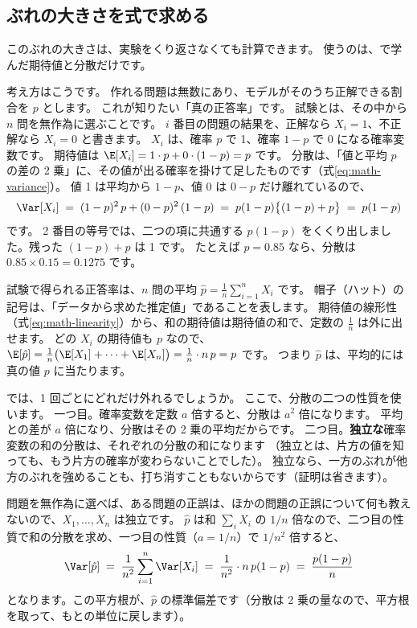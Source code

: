 \subsection*{ぶれの大きさを式で求める}

このぶれの大きさは、実験をくり返さなくても計算できます。
使うのは、で学んだ期待値と分散だけです。

考え方はこうです。
作れる問題は無数にあり、モデルがそのうち正解できる割合を $p$ とします。
これが知りたい「真の正答率」です。
試験とは、その中から $n$ 問を無作為に選ぶことです。
$i$ 番目の問題の結果を、正解なら $X_i=1$、不正解なら $X_i=0$ と書きます。
$X_i$ は、確率 $p$ で 1、確率 $1-p$ で 0 になる確率変数です。
期待値は $\E[X_i]=1\cdot p+0\cdot(1-p)=p$ です。
分散は、「値と平均 $p$ の差の 2 乗」に、その値が出る確率を掛けて足したものです（式\eqref{eq:math-variance}）。
値 1 は平均から $1-p$、値 0 は $0-p$ だけ離れているので、
\[
\Var[X_i]\;=\;(1-p)^2\,p+(0-p)^2\,(1-p)\;=\;p(1-p)\bigl\{(1-p)+p\bigr\}\;=\;p(1-p)
\]
です。
2 番目の等号では、二つの項に共通する $p(1-p)$ をくくり出しました。残った $(1-p)+p$ は 1 です。
たとえば $p=0.85$ なら、分散は $0.85\times0.15=0.1275$ です。

試験で得られる正答率は、$n$ 問の平均 $\hat p=\frac{1}{n}\sum_{i=1}^{n}X_i$ です。
帽子（ハット）の記号は、「データから求めた推定値」であることを表します。
期待値の線形性（式\eqref{eq:math-linearity}）から、和の期待値は期待値の和で、定数の $\frac1n$ は外に出せます。
どの $X_i$ の期待値も $p$ なので、$\E[\hat p]=\frac{1}{n}\bigl(\E[X_1]+\dots+\E[X_n]\bigr)=\frac{1}{n}\cdot n\,p=p$ です。
つまり $\hat p$ は、平均的には真の値 $p$ に当たります。

では、1 回ごとにどれだけ外れるでしょうか。
ここで、分散の二つの性質を使います。
一つ目。確率変数を定数 $a$ 倍すると、分散は $a^2$ 倍になります。
平均との差が $a$ 倍になり、分散はその 2 乗の平均だからです。
二つ目。\textbf{独立な}確率変数の和の分散は、それぞれの分散の和になります
（独立とは、片方の値を知っても、もう片方の確率が変わらないことでした）。
独立なら、一方のぶれが他方のぶれを強めることも、打ち消すこともないからです（証明は省きます）。

問題を無作為に選べば、ある問題の正誤は、ほかの問題の正誤について何も教えないので、$X_1,\dots,X_n$ は独立です。
$\hat p$ は和 $\sum_i X_i$ の $1/n$ 倍なので、二つ目の性質で和の分散を求め、一つ目の性質（$a=1/n$）で $1/n^2$ 倍すると、
\begin{equation}
\Var[\hat p] \;=\; \frac{1}{n^2}\sum_{i=1}^{n}\Var[X_i] \;=\; \frac{1}{n^2}\cdot n\,p(1-p) \;=\; \frac{p(1-p)}{n}
\label{eq:es-var}
\end{equation}
となります。この平方根が、$\hat p$ の標準偏差です（分散は 2 乗の量なので、平方根を取って、もとの単位に戻します）。

